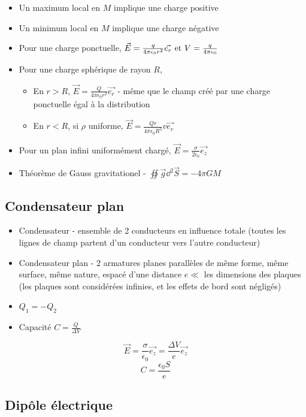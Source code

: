 \documentclass[openany]{book}
\begin{document}
\begin{itemize}
    \item Un maximum local en $M$ implique une charge positive
    \item Un minimum local en $M$ implique une charge négative
    \item Pour une charge ponctuelle, $\vec{E} = \frac{q}{4\pi\epsilon_0 r^2} \vec{e_r} \text{ et } V = \frac{q}{4\pi\epsilon_0}$
    \item Pour une charge sphérique de rayon $R$,
    \begin{itemize}
        \item En $r > R$, $\vec{E} = \frac{Q}{4 \pi \epsilon_0 r^2} \vec{e_r}$ - même que le champ créé par une charge ponctuelle égal à la distribution
        \item En $r < R$, si $\rho$ uniforme, $\vec{E} = \frac{Q r}{4 \pi \epsilon_0 R^3}v\vec{e_r}$
    \end{itemize}
    \item Pour un plan infini uniformément chargé, $\vec{E} = \frac{\sigma}{2\epsilon_0} \vec{e_z}$
    \item Théorème de Gauss gravitationel - $\oiint \vec{g} \dd^2 \vec{S} = -4\pi G M$
\end{itemize}

\subsection{Condensateur plan}

\begin{itemize}
    \item Condensateur - ensemble de 2 conducteurs en influence totale (toutes les lignes de champ partent d'un conducteur vers l'autre conducteur)
    \item Condensateur plan - 2 armatures planes parallèles de même forme, même surface, même nature, espacé d'une distance $e \ll $ les dimensions des plaques (les plaques sont considérées infinies, et les effets de bord sont négligés)
    \item $Q_1  = - Q_2$
    \item Capacité $C = \frac{Q}{\Delta V}$
\end{itemize}

\[ \vec{E} = \frac{\sigma}{\epsilon_0}\vec{e_z} = \frac{\Delta V}{e} \vec{e_z}  \]
\[ C = \frac{\epsilon_0 S}{e} \]

\subsection{Dipôle électrique}
\end{document}
